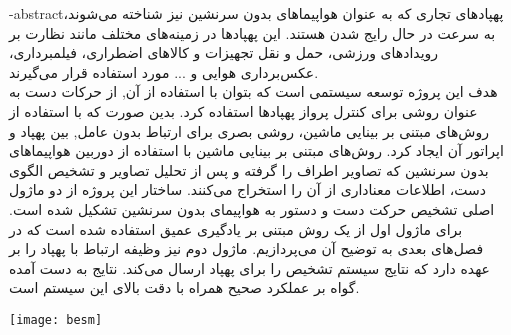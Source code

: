 \department{}
\secondsupervisor{}


\fa-abstract{پهپادهای تجاری که به عنوان هواپیما‌های بدون سرنشین 
نیز شناخته می‌شوند، به سرعت در حال رایج شدن هستند. این پهپاد‌ها در زمینه‌های مختلف مانند نظارت بر رویدادهای ورزشی، حمل و نقل تجهیزات
 و کالاهای اضطراری، فیلمبرداری، عکس‌برداری هوایی و ... مورد استفاده قرار می‌گیرند.
  \\
هدف این پروژه توسعه سیستمی است که بتوان با استفاده از آن, از حرکات دست به عنوان روشی برای کنترل پرواز پهپاد‌ها استفاده کرد.
بدین صورت که با استفاده از روش‌های مبتنی بر بینایی ماشین، روشی بصری برای ارتباط بدون عامل, بین پهپاد و اپراتور آن ایجاد کرد.
 روش‌های مبتنی بر بینایی ماشین با استفاده از دوربین هواپیما‌های بدون سرنشین که تصاویر اطراف را گرفته و پس
 از تحلیل تصاویر و تشخیص الگوی دست، اطلاعات معناداری از آن را استخراج می‌کنند. ساختار این پروژه از دو ماژول
 اصلی تشخیص حرکت دست
 و دستور به هواپیمای بدون سرنشین تشکیل شده است. برای ماژول اول از یک روش مبتنی بر
 یادگیری عمیق
  استفاده شده است که در فصل‌های بعدی به توضیح آن می‌پردازیم. ماژول دوم نیز وظیفه ارتباط با پهپاد را بر عهده دارد که نتایج سیستم تشخیص را برای پهپاد ارسال می‌کند.
 نتایج به دست آمده گواه بر عملکرد صحیح همراه با دقت بالای این سیستم است.
 }



\vspace*{7cm}
\thispagestyle{empty}
\begin{center}
\texttt{[image: besm]}
\end{center}